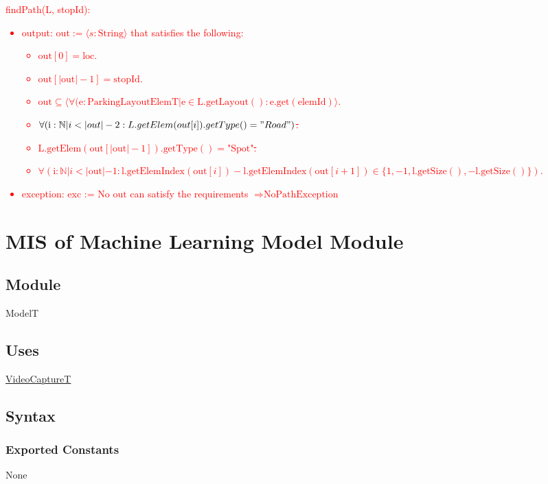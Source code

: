 \documentclass[12pt, titlepage]{article}
\begin{document}
\textcolor{red}{ \noindent findPath(L, stopId):
\begin{itemize}
\item output: $\text{out} := \langle s : \text{String} \rangle$ that satisfies
the following:
\begin{itemize}
\item $\text{out}[0] = \text{loc}$.
\item $\text{out}[|\text{out}| - 1] = \text{stopId}$.
\item $\text{out} \subseteq \langle \forall (\text{e} :
\text{ParkingLayoutElemT} | \text{e} \in \text{L}.\text{getLayout}() :
\text{e}.\text{get}(\text{elemId}) \rangle$.
\item \st{$\forall (\text{i} : \mathbb{N} | i < |out| - 2 :
L.getElem(out[i]).getType() = "Road")$.}
\item \st{$\text{L}.\text{getElem}(\text{out}[|\text{out}| -
1]).\text{getType}() = \text{"Spot"}$.}
\item $\forall (\text{i} : \mathbb{N} | i < |\text{out}| - 1 :
\text{l}.\text{getElemIndex}(\text{out}[i]) -
\text{l}.\text{getElemIndex}(\text{out}[i + 1]) \in \{1, -1,
\text{l}.\text{getSize}(), -\text{l}.\text{getSize}()\})$.
\end{itemize}
\item exception: exc := No $\text{out}$ can satisfy the requirements
$\Rightarrow \text{NoPathException}$
\end{itemize}
}

\newpage

\section{MIS of Machine Learning Model Module} 
\label{machineLearningModel:Module}

\subsection{Module}
ModelT

\subsection{Uses}
\hyperref[VideoCapture:Module]{VideoCaptureT}


\subsection{Syntax}

\subsubsection{Exported Constants}
None
\end{document}
